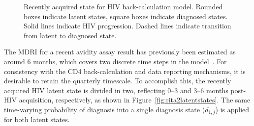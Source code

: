 \begin{figure}[htbp!]
  \centering
  \footnotesize
  \caption[Recently acquired state for HIV back-calculation model]{Recently acquired state for HIV back-calculation model. Rounded boxes indicate latent states, square boxes indicate diagnosed states. Solid lines indicate HIV progression. Dashed lines indicate transition from latent to diagnosed state.}\label{fig:naiverita}
\end{figure}

The MDRI for a recent avidity assay result has previously been estimated as around 6 months, which covers two discrete time steps in the model~\parencite{Sweeting2010-hm, Kassanjee2014-gc}. For consistency with the CD4 back-calculation and data reporting mechanisms, it is desirable to retain the quarterly timescale. To accomplish this, the recently acquired HIV latent state is divided in two, reflecting 0--3 and 3--6 months post-HIV acquisition, respectively, as shown in Figure~\ref{fig:rita2latentstates}. The same time-varying probability of diagnosis into a single diagnosis state ($d_{1,j}$) is applied for both latent states.

